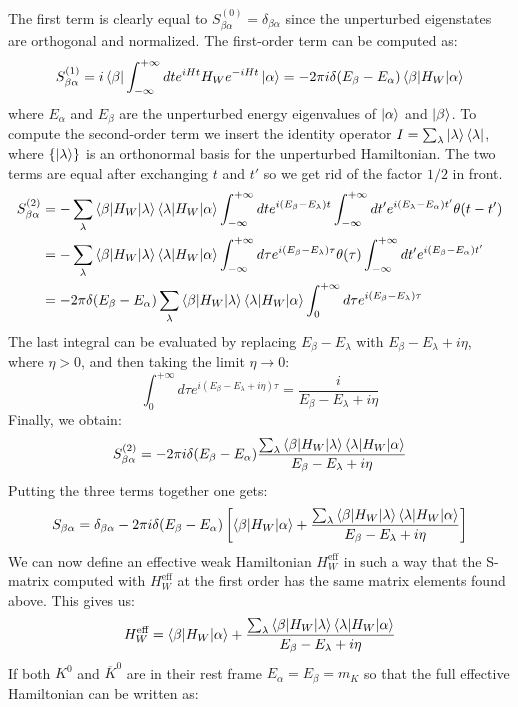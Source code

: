 \documentclass[../main.tex]{subfiles}
\begin{document}
The first term is clearly equal to $S_{\beta\alpha}^{(0)}=\delta_{\beta\alpha}$ since the unperturbed eigenstates are orthogonal and normalized. The first-order term can be computed as:
\[
S_{\beta\alpha}^{(1)}=i\bra{\beta}\int_{-\infty}^{+\infty}dte^{iHt}H_We^{-iHt}\ket{\alpha}=-2\pi i\delta(E_\beta-E_\alpha)\braket{\beta|H_W|\alpha}
\]
where $E_\alpha$ and $E_\beta$ are the unperturbed energy eigenvalues of $\ket{\alpha}$ and $\ket{\beta}$. To compute the second-order term we insert the identity operator $I=\sum_\lambda\ket{\lambda}\bra{\lambda}$, where $\{\ket{\lambda}\}$ is an orthonormal basis for the unperturbed Hamiltonian. The two terms are equal after exchanging $t$ and $t'$ so we get rid of the factor $1/2$ in front.
\begin{align*}
S_{\beta\alpha}^{(2)}&=-\sum_\lambda\braket{\beta|H_W|\lambda}\braket{\lambda|H_W|\alpha}\int_{-\infty}^{+\infty}dte^{i(E_\beta-E_\lambda)t}\int_{-\infty}^{+\infty}dt'e^{i(E_\lambda-E_\alpha)t'}\theta(t-t')\\
&=-\sum_\lambda\braket{\beta|H_W|\lambda}\braket{\lambda|H_W|\alpha}\int_{-\infty}^{+\infty}d\tau e^{i(E_\beta-E_\lambda)\tau}\theta(\tau)\int_{-\infty}^{+\infty}dt'e^{i(E_\beta-E_\alpha)t'}\\
&=-2\pi\delta(E_\beta-E_\alpha)\sum_\lambda\braket{\beta|H_W|\lambda}\braket{\lambda|H_W|\alpha}\int_0^{+\infty}d\tau e^{i(E_\beta-E_\lambda)\tau}
\end{align*}
The last integral can be evaluated by replacing $E_\beta-E_\lambda$ with $E_\beta-E_\lambda+i\eta$, where $\eta>0$, and then taking the limit $\eta\to0$:
\[
\int_0^{+\infty}d\tau e^{i(E_\beta-E_\lambda+i\eta)\tau}=\frac{i}{E_\beta-E_\lambda+i\eta}
\]
Finally, we obtain:
\[
S_{\beta\alpha}^{(2)}=-2\pi i\delta(E_\beta-E_\alpha)\frac{\sum_\lambda\braket{\beta|H_W|\lambda}\braket{\lambda|H_W|\alpha}}{E_\beta-E_\lambda+i\eta}
\]
Putting the three terms together one gets:
\[
S_{\beta\alpha}=\delta_{\beta\alpha}-2\pi i\delta(E_\beta-E_\alpha)\left[\braket{\beta|H_W|\alpha}+\frac{\sum_\lambda\braket{\beta|H_W|\lambda}\braket{\lambda|H_W|\alpha}}{E_\beta-E_\lambda+i\eta}\right]
\]
We can now define an effective weak Hamiltonian $H_W^{\text{eff}}$ in such a way that the S-matrix computed with $H_W^{\text{eff}}$ at the first order has the same matrix elements found above. This gives us:
\[
H_W^{\text{eff}}=\braket{\beta|H_W|\alpha}+\frac{\sum_\lambda\braket{\beta|H_W|\lambda}\braket{\lambda|H_W|\alpha}}{E_\beta-E_\lambda+i\eta}
\]
If both $K^0$ and $\overline{K}^0$ are in their rest frame $E_\alpha=E_\beta=m_K$ so that the full effective Hamiltonian can be written as:
\end{document}
